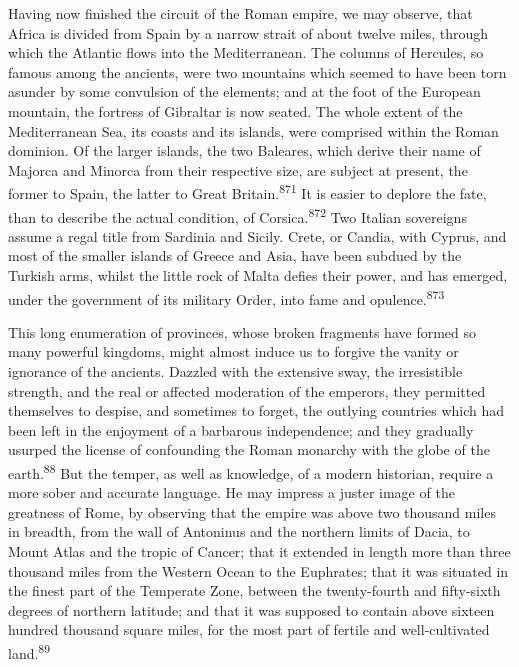 Having now finished the circuit of the Roman empire, we may
observe, that Africa is divided from Spain by a narrow strait of
about twelve miles, through which the Atlantic flows into the
Mediterranean. The columns of Hercules, so famous among the
ancients, were two mountains which seemed to have been torn
asunder by some convulsion of the elements; and at the foot of
the European mountain, the fortress of Gibraltar is now seated.
The whole extent of the Mediterranean Sea, its coasts and its
islands, were comprised within the Roman dominion. Of the larger
islands, the two Baleares, which derive their name of Majorca and
Minorca from their respective size, are subject at present, the
former to Spain, the latter to Great Britain.\textsuperscript{871} It is easier to
deplore the fate, than to describe the actual condition, of
Corsica.\textsuperscript{872} Two Italian sovereigns assume a regal title from
Sardinia and Sicily. Crete, or Candia, with Cyprus, and most of
the smaller islands of Greece and Asia, have been subdued by the
Turkish arms, whilst the little rock of Malta defies their power,
and has emerged, under the government of its military Order, into
fame and opulence.\textsuperscript{873}




This long enumeration of provinces, whose broken fragments have
formed so many powerful kingdoms, might almost induce us to
forgive the vanity or ignorance of the ancients. Dazzled with the
extensive sway, the irresistible strength, and the real or
affected moderation of the emperors, they permitted themselves to
despise, and sometimes to forget, the outlying countries which
had been left in the enjoyment of a barbarous independence; and
they gradually usurped the license of confounding the Roman
monarchy with the globe of the earth.\textsuperscript{88} But the temper, as well
as knowledge, of a modern historian, require a more sober and
accurate language. He may impress a juster image of the greatness
of Rome, by observing that the empire was above two thousand
miles in breadth, from the wall of Antoninus and the northern
limits of Dacia, to Mount Atlas and the tropic of Cancer; that it
extended in length more than three thousand miles from the
Western Ocean to the Euphrates; that it was situated in the
finest part of the Temperate Zone, between the twenty-fourth and
fifty-sixth degrees of northern latitude; and that it was
supposed to contain above sixteen hundred thousand square miles,
for the most part of fertile and well-cultivated land.\textsuperscript{89}



